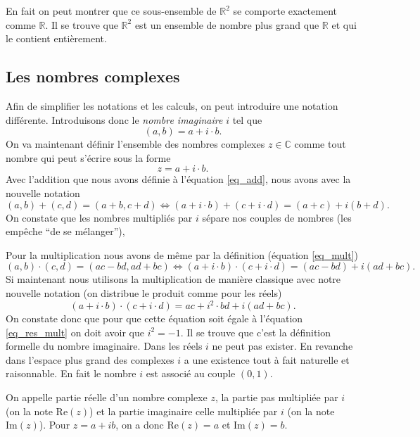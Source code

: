 \documentclass[a4paper,12pt]{book}
\newcommand{\real}{\mathbb{R}}
\newcommand{\complex}{\mathbb{C}}
\renewcommand{\Re}{\mathrm{Re}}
\renewcommand{\Im}{\mathrm{Im}}
\begin{document}
En fait on peut montrer que ce sous-ensemble de $\real^2$ se comporte exactement comme $\real$. Il se trouve que $\real^2$ est
un ensemble de nombre plus grand que $\real$ et qui le contient entièrement.

\subsection{Les nombres complexes}

Afin de simplifier les notations et les calculs, on peut introduire une notation différente.
Introduisons donc le \textit{nombre imaginaire} $i$ tel que
\begin{equation}
 (a,b)=a+i\cdot b.
\end{equation}
On va maintenant définir l'ensemble des nombres complexes $z\in\complex$ comme tout nombre qui peut s'écrire sous 
la forme 
\begin{equation}
 z=a+i\cdot b.
\end{equation}
Avec l'addition que nous avons définie 
à l'équation \eqref{eq_add}, nous avons avec la nouvelle notation
\begin{equation}
 (a,b)+(c,d)=(a+b,c+d)\Leftrightarrow(a+i\cdot b)+(c+i\cdot d)=(a+c)+i(b+d).
\end{equation}
On constate que les nombres multipliés par $i$ sépare nos couples de nombres (les empêche ``de se mélanger''),

Pour la multiplication nous avons de même par la définition (équation \eqref{eq_mult})
\begin{equation}
 (a,b)\cdot(c,d)=(ac-bd,ad+bc)\Leftrightarrow(a+i\cdot b)\cdot(c+i\cdot d)=(ac-bd)+i(ad+bc).\label{eq_res_mult}
\end{equation}
Si maintenant nous utilisons la multiplication de manière classique avec notre nouvelle notation (on distribue le produit 
comme pour les réels)
\begin{equation}
 (a+i\cdot b)\cdot(c+i\cdot d)=ac+i^2\cdot bd+i(ad+bc).
\end{equation}
On constate donc que pour que cette équation soit égale à l'équation \eqref{eq_res_mult}
on doit avoir que $i^2=-1$. Il se trouve que c'est la définition formelle du nombre imaginaire.
Dans les réels $i$ ne peut pas exister. En revanche dans l'espace plus grand des complexes $i$
a une existence tout à fait naturelle et raisonnable. En fait le nombre $i$ est associé au couple $(0,1)$.

On appelle partie réelle d'un nombre complexe $z$, la partie pas multipliée par $i$ (on la note $\Re(z)$) et la partie imaginaire
celle multipliée par $i$ (on la note $\Im(z)$). Pour $z=a+ib$, on a donc $\Re(z)=a$ et $\Im(z)=b$.
\end{document}
